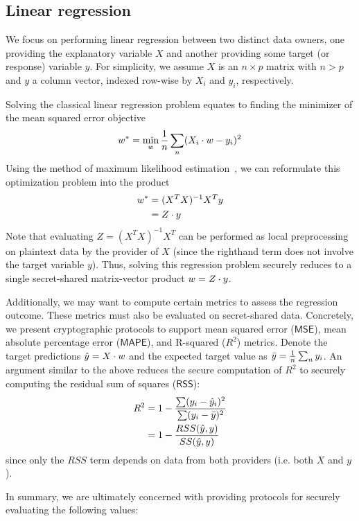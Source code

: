 
\subsection{Linear regression}
\label{sec:linreg}

We focus on performing linear regression between two distinct data owners, one providing the explanatory variable $X$ and another providing some target (or response) variable $y$. For simplicity, we assume $X$ is an $n \times p$ matrix with $n > p$ and $y$ a column vector, indexed row-wise by $X_i$ and $y_i$, respectively.

Solving the classical linear regression problem equates to finding the minimizer of the mean squared error objective
\begin{align*}
w^* = \min_{w}\frac{1}{n} \sum_n (X_i \cdot w - y_i)^2
\end{align*}
Using the method of maximum likelihood estimation~\cite{mml}, we can reformulate this optimization problem into the product
\begin{align*}
w^* &= (X^TX)^{-1}X^Ty
\\
&= Z \cdot y
\end{align*}
Note that evaluating $Z = (X^TX)^{-1}X^T$ can be performed as local preprocessing on plaintext data by the provider of $X$ (since the righthand term does not involve the target variable $y$). Thus, solving this regression problem securely reduces to a single secret-shared matrix-vector product $w = Z \cdot y$.

Additionally, we may want to compute certain metrics to assess the regression
outcome. These metrics must also be evaluated on secret-shared data. Concretely,
we present cryptographic protocols to support mean squared error
($\mathsf{MSE}$), mean absolute percentage error
($\mathsf{MAPE}$), and R-squared ($R^2$) metrics. Denote the target predictions $\hat{y} = X \cdot
w$ and the expected target value as $\bar{y} = \frac{1}{n} \sum_n y_i$. An
argument similar to the above reduces the secure computation of $R^2$ to
securely computing the residual sum of squares ($\mathsf{RSS}$):
\begin{align*}
R^2 &= 1 - \frac{\sum(y_i - \hat{y}_i)^2}{\sum(y_i - \bar{y})^2}
\\
&= 1 - \frac{RSS(\hat{y}, y)}{SS(\hat{y}, y)}
\end{align*}
since only the $RSS$ term depends on data from both providers (i.e. both $X$ and $y$).

In summary, we are ultimately concerned with providing protocols for securely evaluating the following values:

